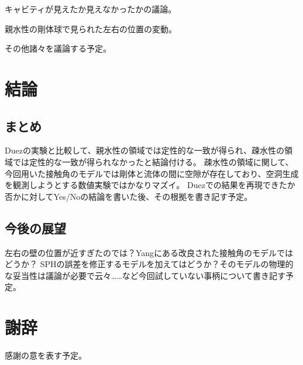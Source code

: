 \documentclass[]{jsarticle}
\begin{document}
キャビティが見えたか見えなかったかの議論。

親水性の剛体球で見られた左右の位置の変動。

その他諸々を議論する予定。
\newpage
\section{結論}
\subsection{まとめ}
Duezの実験と比較して、親水性の領域では定性的な一致が得られ、疎水性の領域では定性的な一致が得られなかったと結論付ける。
疎水性の領域に関して、今回用いた接触角のモデルでは剛体と流体の間に空隙が存在しており、空洞生成を観測しようとする数値実験ではかなりマズイ。
Duez\cite{Duez2007}での結果を再現できたか否かに対してYes/Noの結論を書いた後、その根拠を書き記す予定。
\subsection{今後の展望}
左右の壁の位置が近すぎたのでは？Yang\cite{Yang2017}にある改良された接触角のモデルではどうか？
SPHの誤差を修正するモデルを加えてはどうか？そのモデルの物理的な妥当性は議論が必要で云々……など今回試していない事柄について書き記す予定。
\newpage

\section{謝辞}
感謝の意を表す予定。
\newpage



\end{document}
